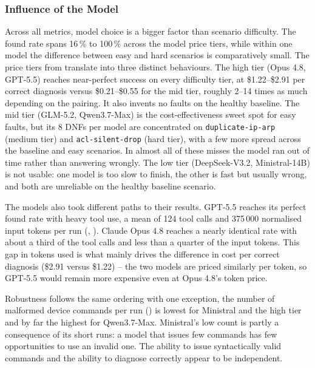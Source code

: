 \subsubsection{Influence of the Model}
\label{sec:discussion-model}

Across all metrics, model choice is a bigger factor than scenario difficulty. The found rate
spans 16\,\% to 100\,\% across the model price tiers, while within one model the difference between
easy and hard scenarios is comparatively small. The price tiers from 
translate into three distinct behaviours. The high tier (Opus 4.8, GPT-5.5) reaches
near-perfect success on every difficulty tier, at \$1.22--\$2.91 per correct diagnosis versus
\$0.21--\$0.55 for the mid tier, roughly 2--14 times as much depending on the pairing. It also
invents no faults on the healthy baseline. The
mid tier (GLM-5.2, Qwen3.7-Max) is the cost-effectiveness sweet spot for easy faults, but
its 8 DNFs per model are concentrated on \texttt{duplicate-ip-arp} (medium tier) and
\texttt{acl-silent-drop} (hard tier), with a few more spread across the baseline and easy
scenarios. In almost all of these misses the model ran out of time rather than answering wrongly.
The low tier
(DeepSeek-V3.2, Ministral-14B) is not usable: one model is too slow to finish, the other is fast
but usually wrong, and both are unreliable on the healthy baseline scenario.

The models also took different paths to their results. GPT-5.5 reaches its
perfect found rate with heavy tool use, a mean of 124 tool calls and 375\,000 normalised input tokens
per run (, ). Claude Opus 4.8 reaches a nearly
identical rate with about a third of the tool calls and less than a quarter of the input
tokens. This gap in tokens used is what mainly
drives the difference in cost per correct diagnosis (\$2.91 versus \$1.22) -- the two models are
priced similarly per token, so GPT-5.5 would remain more expensive even at Opus 4.8's token price.

Robustness follows the same ordering with one exception, the number of malformed device commands
per run () is lowest for Ministral and the high tier and by far the
highest for Qwen3.7-Max. Ministral's low count is partly a consequence of its short
runs: a model that issues few commands has few opportunities to use an invalid one. The ability
to issue syntactically valid commands and the ability to
diagnose correctly appear to be independent.
